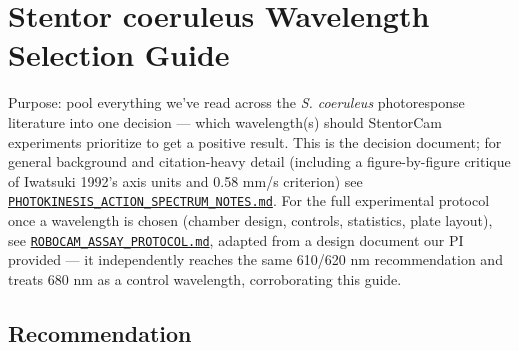 \documentclass[
]{article}
\author{}
\date{}
\begin{document}
\hypertarget{stentor-coeruleus-wavelength-selection-guide}{%
\section{Stentor coeruleus Wavelength Selection
Guide}\label{stentor-coeruleus-wavelength-selection-guide}}

Purpose: pool everything we've read across the \emph{S. coeruleus}
photoresponse literature into one decision --- which wavelength(s)
should StentorCam experiments prioritize to get a positive result. This
is the decision document; for general background and citation-heavy
detail (including a figure-by-figure critique of Iwatsuki 1992's axis
units and 0.58 mm/s criterion) see
\href{PHOTOKINESIS_ACTION_SPECTRUM_NOTES.md}{\texttt{PHOTOKINESIS\_ACTION\_SPECTRUM\_NOTES.md}}.
For the full experimental protocol once a wavelength is chosen (chamber
design, controls, statistics, plate layout), see
\href{ROBOCAM_ASSAY_PROTOCOL.md}{\texttt{ROBOCAM\_ASSAY\_PROTOCOL.md}},
adapted from a design document our PI provided --- it independently
reaches the same 610/620 nm recommendation and treats 680 nm as a
control wavelength, corroborating this guide.

\hypertarget{recommendation}{%
\subsection{Recommendation}\label{recommendation}}
\end{document}
